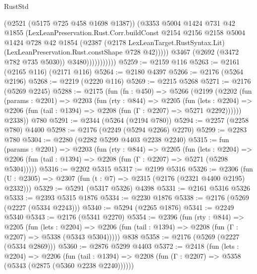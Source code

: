 \begin{lexlean}{RustStd}
\begin{coremodule}
                            (@2521 (@5175 @725 @458 @1698 @1387))
                            (@3353
                              @5004
                              @1424
                              @731
                              @42
                              @1855
                              (LexLeanPreservation.Rust.Corr.buildConst
                                @2154
                                @2156
                                @2158
                                @5004
                                @1424
                                @728
                                @42
                                @1854
                                (@2387
                                  (@2178 LexLeanTarget.RustSyntax.Lit)
                                  (LexLeanPreservation.Rust.constShape @728 @42)))))
                          @3467
                          (@2692 (@3472 @782 @735 @5030))
                          @3480)))))))))))
@5259 := @2159 @116
@5263 := @2161 (@2165 @116) (@2171 @116)
@5264 := @2180 @4397
@5266 := @2176 (@5264 @2196)
@5268 := @2219 (@2220 @116)
@5269 := @2215 @5268
@5271 := @2176 (@5269 @2245)
@5288 := @2175
    (fun (fn : @450) =>
    @5266
      (@2199
        (@2202
          (fun (params : @2201) =>
          @2203
            (fun (rty : @844) =>
            @2205
              (fun (lets : @2204) =>
              @2206 (fun (tail : @1394) => @2208 (fun (Γ : @2207) => @5271 @2292))))))
        @2338))
    @780
@5291 := @2344 (@5264 (@2194 @780))
@5294 := @2257 (@2258 @780) @4400
@5298 := @2176 (@2249 (@5294 @2266) @2270)
@5299 := @2283 @780
@5304 := @2280 (@2282 @5299 @4403 @2238 @2240)
@5315 := fun (params : @2201) =>
  @2203
    (fun (rty : @844) =>
    @2205
      (fun (lets : @2204) =>
      @2206 (fun (tail : @1394) => @2208 (fun (Γ : @2207) => @5271 (@5298 @5304)))))
@5316 := @2202 @5315
@5317 := @2199 @5316
@5326 := @2306 (fun (U : @2305) => @2307 (fun (t : @7) => @2315 (@2176 (@2321 @4400 @2195) @2332)))
@5329 := @5291 (@5317 @5326) @4398
@5331 := @2161 @5316 @5326
@5333 := @2393 @5315 @1876
@5334 := @2230 @1876
@5338 := @2176 (@5269 (@2227 (@5334 @2243)))
@5340 := @5294 (@2265 @1876)
@5341 := @2249 @5340
@5343 := @2176 (@5341 @2270)
@5354 := @2396
    (fun (rty : @844) =>
    @2205
      (fun (lets : @2204) =>
      @2206 (fun (tail : @1394) => @2208 (fun (Γ : @2207) => @5338 (@5343 @5304)))))
    @838
@5358 := @2176 (@5269 (@2227 (@5334 @2869)))
@5360 := @2876 @5299 @4403
@5372 := @2418
    (fun (lets : @2204) =>
    @2206
      (fun (tail : @1394) => @2208 (fun (Γ : @2207) => @5358 (@5343 (@2875 (@5360 @2238 @2240))))))

\end{coremodule}
\end{lexlean}
